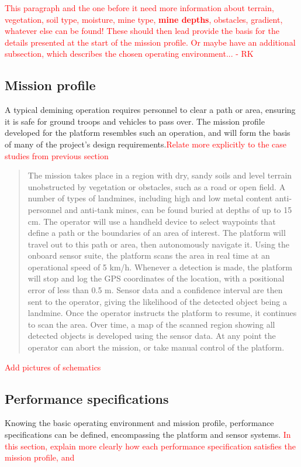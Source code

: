\documentclass[main.tex]{subfiles}
\begin{document}
\textcolor{red}{This paragraph and the one before it need more information about terrain, vegetation, soil type, moisture, mine type, \textbf{mine depths}, obstacles, gradient, whatever else can be found! These should then lead provide the basis for the details presented at the start of the mission profile. Or maybe have an additional subsection, which describes the chosen operating environment... - RK}

\subsection{Mission profile}
A typical demining operation requires personnel to clear a path or area, ensuring it is safe for ground troops and vehicles to pass over. The mission profile developed for the platform resembles such an operation, and will form the basis of many of the project's design requirements.\textcolor{red}{Relate more explicitly to the case studies from previous section}
\begin{quote}The mission takes place in a region with dry, sandy soils and level terrain unobstructed by vegetation or obstacles, such as a road or open field. A number of types of landmines, including high and low metal content anti-personnel and anti-tank mines, can be found buried at depths of up to 15 cm. The operator will use a handheld device to select waypoints that define a path or the boundaries of an area of interest. The platform will travel out to this path or area, then autonomously navigate it. Using the onboard sensor suite, the platform scans the area in real time at an operational speed of 5 km/h. Whenever a detection is made, the platform will stop and log the GPS coordinates of the location, with a positional error of less than 0.5 m. Sensor data and a confidence interval are then sent to the operator, giving the likelihood of the detected object being a landmine. Once the operator instructs the platform to resume, it continues to scan the area. Over time, a map of the scanned region showing all detected objects is developed using the sensor data. At any point the operator can abort the mission, or take manual control of the platform.
\end{quote}
\textcolor{red}{Add pictures of schematics}

\subsection{Performance specifications}
Knowing the basic operating environment and mission profile, performance specifications can be defined, encompassing the platform and sensor systems. \textcolor{red}{In this section, explain more clearly how each performance specification satisfies the mission profile, and }
\end{document}
